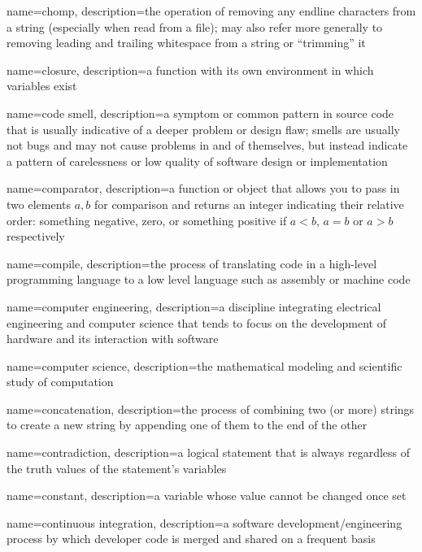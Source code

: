 {
  name=chomp,
  description={the operation of removing any endline characters from a string (especially when read from a file); may also refer more generally to removing leading and trailing whitespace from a string or ``trimming'' it}
}

{
  name=closure,
  description={a function with its own environment in which variables exist}
}

{
  name=code smell,
  description={a symptom or common pattern in source code that is usually indicative of a deeper problem or design flaw; smells are usually not bugs and may not cause problems in and of themselves, but instead indicate a pattern of carelessness or low quality of software design or implementation}
}

{
  name=comparator,
  description={a function or object that allows you to pass in two elements $a, b$ for comparison and returns an integer indicating their relative order: something negative, zero, or something positive if $a < b$, $a = b$ or $a > b$ respectively}
}

{
  name=compile,
  description={the process of translating code in a high-level programming language to a low level language such as assembly or machine code}
}

{
  name=computer engineering,
  description={a discipline integrating electrical engineering and computer science that tends to focus on the development of hardware and its interaction with software}
}

{
  name=computer science,
  description={the mathematical modeling and scientific study of computation}
}

{
  name=concatenation,
  description={the process of combining two (or more) strings to create a new string by appending one of them to the end of the other}
}

{
  name=contradiction,
  description={a logical statement that is always \False regardless of the truth values of the statement's variables}
}

{
  name=constant,
  description={a variable whose value cannot be changed once set}
}

{
  name=continuous integration,
  description={a software development/engineering process by which developer code is merged and shared on a frequent basis}
}

